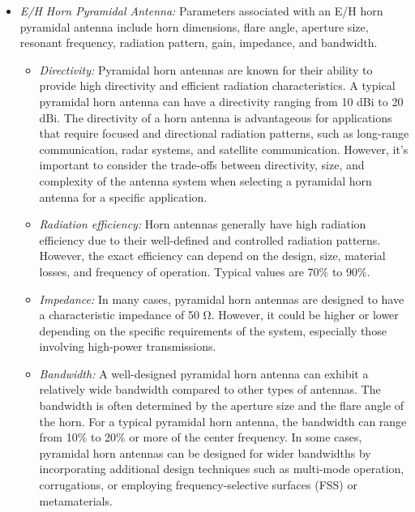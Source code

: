 \documentclass[11pt,a4paper]{article}
\renewcommand{\ohm}{{\mathrm{\Omega}}}
\begin{document}
\begin{itemize}
    \item \emph{E/H Horn Pyramidal Antenna:} Parameters associated with an E/H horn pyramidal antenna include horn dimensions, flare angle, aperture size, resonant frequency, radiation pattern, gain, impedance, and bandwidth.
    \begin{itemize}
        \item \emph{Directivity:} Pyramidal horn antennas are known for their ability to provide high directivity and efficient radiation characteristics. A typical pyramidal horn antenna can have a directivity ranging from 10 dBi to 20 dBi. The directivity of a horn antenna is advantageous for applications that require focused and directional radiation patterns, such as long-range communication, radar systems, and satellite communication. However, it's important to consider the trade-offs between directivity, size, and complexity of the antenna system when selecting a pyramidal horn antenna for a specific application.
        \item \emph{Radiation efficiency:} Horn antennas generally have high radiation efficiency due to their well-defined and controlled radiation patterns. However, the exact efficiency can depend on the design, size, material losses, and frequency of operation. Typical values are 70\% to 90\%.
        \item \emph{Impedance:} In many cases, pyramidal horn antennas are designed to have a characteristic impedance of 50 $\ohm$. However, it could be higher or lower depending on the specific requirements of the system, especially those involving high-power transmissions.
        \item \emph{Bandwidth:} A well-designed pyramidal horn antenna can exhibit a relatively wide bandwidth compared to other types of antennas. The bandwidth is often determined by the aperture size and the flare angle of the horn. For a typical pyramidal horn antenna, the bandwidth can range from 10\% to 20\% or more of the center frequency. In some cases, pyramidal horn antennas can be designed for wider bandwidths by incorporating additional design techniques such as multi-mode operation, corrugations, or employing frequency-selective surfaces (FSS) or metamaterials.
    \end{itemize}
    

\end{itemize}
\end{document}
